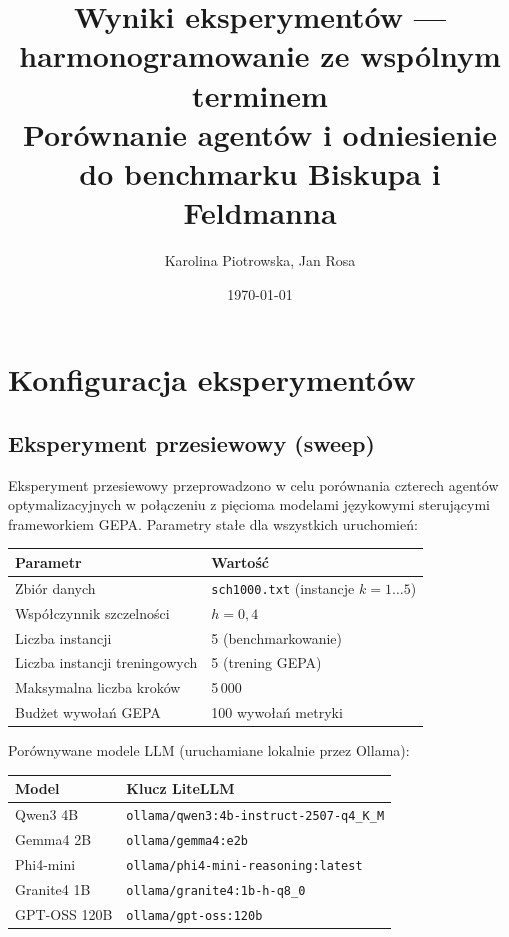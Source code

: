 \documentclass[11pt,a4paper]{article}
\title{\textbf{Wyniki eksperymentów — harmonogramowanie ze wspólnym terminem}\\[4pt]
    \large Porównanie agentów i odniesienie do benchmarku Biskupa i Feldmanna}
\author{Karolina Piotrowska, Jan Rosa}
\date{\today}
\begin{document}
\maketitle
\tableofcontents
\newpage

\section{Konfiguracja eksperymentów}

\subsection{Eksperyment przesiewowy (sweep)}

Eksperyment przesiewowy przeprowadzono w celu porównania czterech agentów
optymalizacyjnych w połączeniu z pięcioma modelami językowymi sterującymi
frameworkiem GEPA.
Parametry stałe dla wszystkich uruchomień:

\begin{center}
\begin{tabular}{@{}ll@{}}
\toprule
\textbf{Parametr} & \textbf{Wartość} \\
\midrule
Zbiór danych              & \texttt{sch1000.txt} (instancje $k = 1\ldots5$) \\
Współczynnik szczelności  & $h = 0{,}4$ \\
Liczba instancji          & 5 (benchmarkowanie) \\
Liczba instancji treningowych & 5 (trening GEPA) \\
Maksymalna liczba kroków  & 5\,000 \\
Budżet wywołań GEPA       & 100 wywołań metryki \\
\bottomrule
\end{tabular}
\end{center}

Porównywane modele LLM (uruchamiane lokalnie przez Ollama):

\begin{center}
\begin{tabular}{@{}ll@{}}
\toprule
\textbf{Model} & \textbf{Klucz LiteLLM} \\
\midrule
Qwen3 4B          & \texttt{ollama/qwen3:4b-instruct-2507-q4\_K\_M} \\
Gemma4 2B         & \texttt{ollama/gemma4:e2b} \\
Phi4-mini         & \texttt{ollama/phi4-mini-reasoning:latest} \\
Granite4 1B       & \texttt{ollama/granite4:1b-h-q8\_0} \\
GPT-OSS 120B      & \texttt{ollama/gpt-oss:120b} \\
\bottomrule
\end{tabular}
\end{center}
\end{document}
